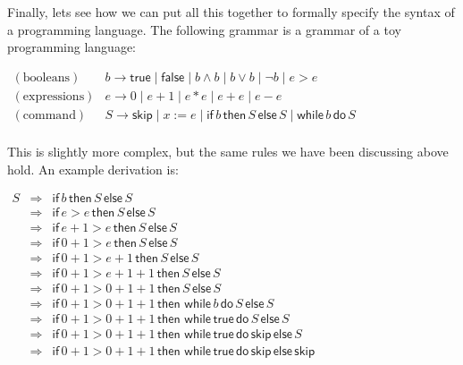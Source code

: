 \documentclass{article}
\begin{document}
Finally, lets see how we can put all this together to formally specify
the syntax of a programming language.  The following grammar is a
grammar of a toy programming language:
\begin{center}
  \begin{math}
    \begin{array}{rll}
      (\text{booleans}) & b \to \mathsf{true} \mid \mathsf{false} \mid
      b \land b \mid b \lor b \mid \lnot b \mid e > e\\
      (\text{expressions}) & e \to 0 \mid e+1 \mid e * e \mid e + e
      \mid e - e\\
      (\text{command}) & S \to \mathsf{skip} \mid x := e \mid
      \mathsf{if}\,b\,\mathsf{then}\,S\,\mathsf{else}\,S \mid
      \mathsf{while}\,b\,\mathsf{do}\,S \\
    \end{array}
  \end{math}
\end{center}
This is slightly more complex, but the same rules we have been
discussing above hold.  An example derivation is:
\begin{center}
  \begin{math}
    \begin{array}{lllllll}
      S & \Rightarrow & \mathsf{if}\, b\,\mathsf{then}\, S \,\mathsf{else}\, S\\
      & \Rightarrow & \mathsf{if}\, e > e\,\mathsf{then}\, S \,\mathsf{else}\, S\\
      & \Rightarrow & \mathsf{if}\, e + 1 > e\, \mathsf{then}\, S \,\mathsf{else}\, S\\
      & \Rightarrow & \mathsf{if}\, 0 + 1 > e\, \mathsf{then}\, S \,\mathsf{else}\, S\\
      & \Rightarrow & \mathsf{if}\, 0 + 1 > e + 1 \,\mathsf{then}\, S \,\mathsf{else}\, S\\
      & \Rightarrow & \mathsf{if}\, 0 + 1 > e + 1 + 1 \,\mathsf{then}\, S \,\mathsf{else}\, S\\
      & \Rightarrow & \mathsf{if}\, 0 + 1 > 0 + 1 + 1 \,\mathsf{then}\, S \,\mathsf{else}\, S\\
      & \Rightarrow & \mathsf{if}\, 0 + 1 > 0 + 1 + 1 \,\mathsf{then}\, \,\mathsf{while}\, b \,\mathsf{do}\, S \,\mathsf{else}\, S\\
      & \Rightarrow & \mathsf{if}\, 0 + 1 > 0 + 1 + 1 \,\mathsf{then}\, \,\mathsf{while}\, \mathsf{true} \,\mathsf{do}\, S \,\mathsf{else}\, S\\
      & \Rightarrow & \mathsf{if}\, 0 + 1 > 0 + 1 + 1 \,\mathsf{then}\, \,\mathsf{while}\, \mathsf{true} \,\mathsf{do}\, \mathsf{skip} \,\mathsf{else}\, S\\
      & \Rightarrow & \mathsf{if}\, 0 + 1 > 0 + 1 + 1 \,\mathsf{then}\, \,\mathsf{while}\, \mathsf{true} \,\mathsf{do}\, \mathsf{skip} \,\mathsf{else}\, \mathsf{skip}\\
    \end{array}
  \end{math}
\end{center}
\end{document}

